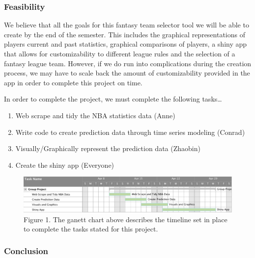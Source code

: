 \documentclass[]{article}
\begin{document}
\subsubsection{Feasibility}\label{feasibility}

We believe that all the goals for this fantasy team selector tool we
will be able to create by the end of the semester. This includes the
graphical representations of players current and past statistics,
graphical comparisons of players, a shiny app that allows for
customizability to different league rules and the selection of a fantasy
league team. However, if we do run into complications during the
creation process, we may have to scale back the amount of
customizability provided in the app in order to complete this project on
time.

In order to complete the project, we must complete the following
tasks\ldots{}

\begin{enumerate}
\def\labelenumi{\arabic{enumi}.}
\item
  Web scrape and tidy the NBA statistics data (Anne)
\item
  Write code to create prediction data through time series modeling
  (Conrad)
\item
  Visually/Graphically represent the prediction data (Zhaobin)
\item
  Create the shiny app (Everyone)
\end{enumerate}

\begin{figure}
\centering
\includegraphics{ganett_chart.png}
\caption{Figure 1. The ganett chart above describes the timeline set in
place to complete the tasks stated for this project.}
\end{figure}

\subsubsection{Conclusion}\label{conclusion}
\end{document}
